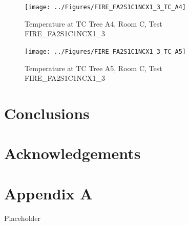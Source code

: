 \documentclass[11pt,oneside]{book}
\begin{document}
\begin{figure}[!ht]
\texttt{[image: ../Figures/FIRE\_FA2S1C1NCX1\_3\_TC\_A4]}
\caption{Temperature at TC Tree A4, Room C, Test FIRE\_FA2S1C1NCX1\_3}
\label{fig:FIRE_FA2S1C1NCX1_3_TC_A4}
\end{figure}

\begin{figure}[!ht]
\texttt{[image: ../Figures/FIRE\_FA2S1C1NCX1\_3\_TC\_A5]}
\caption{Temperature at TC Tree A5, Room C, Test FIRE\_FA2S1C1NCX1\_3}
\label{fig:FIRE_FA2S1C1NCX1_3_TC_A5}
\end{figure}


\clearpage


\chapter{Conclusions}
\label{chap:Conclusions}

\chapter{Acknowledgements}
\label{chap:Acknowledgements}



\appendix

\chapter{Appendix A}

Placeholder
\end{document}

